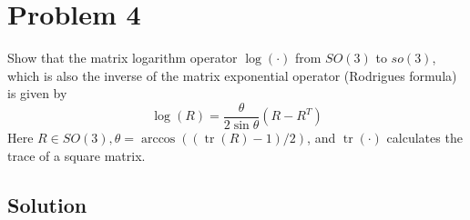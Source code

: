 \section*{Problem 4}

Show that the matrix logarithm operator \( \log (\cdot) \) from \( SO(3) \) to \(so(3)\), which is also the inverse of the matrix exponential operator (Rodrigues formula) is given by
\begin{equation*}
    \log (R) = \frac{\theta}{2 \sin \theta}\left(R-R^{T}\right)
\end{equation*}
Here \( R \in S O(3), \theta=\arccos ((\operatorname{tr}(R)-1) / 2) \), and \( \operatorname{tr}(\cdot) \) calculates the trace of a square matrix.

\subsection*{Solution}
